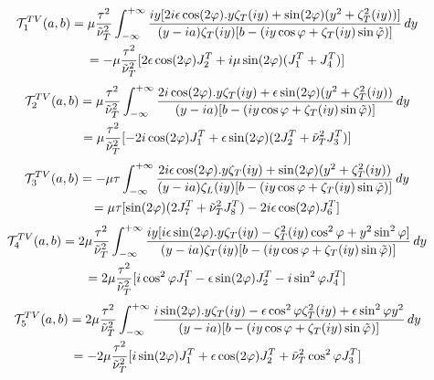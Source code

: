 \begin{multline}
\mathcal{T}_1^{TV}(a,b)= \mu\frac{\tau^2}{\nuti^2_T} \int_{-\infty}^{+\infty} \frac{iy\lbrack 2i\epsilon\cos(2\varphi).y\zeta_T(iy)+\sin(2\varphi)(y^2+\zeta_T^2(iy))\rbrack}{(y-ia)\zeta_T(iy)\lbrack b- (iy\cos \varphi+ \zeta_T(iy)\sin\phiti) \rbrack} \, dy \\
\hfill = -\mu\frac{\tau^2}{\nuti^2_T} \lbrack 2\epsilon\cos(2\varphi) J_2^T+i\mu\sin(2\varphi)(J_1^T+J_4^T)\rbrack \hfill
\end{multline}
\begin{multline}
\mathcal{T}_2^{TV}(a,b)=\mu\frac{\tau^2}{\nuti^2_T} \int_{-\infty}^{+\infty} \frac{2i \cos(2\varphi).y\zeta_T(iy)+\epsilon \sin(2\varphi)(y^2+\zeta_T^2(iy))}{(y-ia)\lbrack b- (iy\cos \varphi+\zeta_T(iy)\sin\phiti )\rbrack} \, dy \\
\hfill=\mu\frac{\tau^2}{\nuti^2_T} \lbrack -2i\cos(2\varphi)J_1^T+\epsilon\sin(2\varphi)(2J_2^T+\nuti_T^2 J_3^T) \rbrack \hfill
\end{multline}
\begin{multline}
\mathcal{T}_3^{TV}(a,b)=-\mu\tau \int_{-\infty}^{+\infty} \frac{ 2i\epsilon\cos(2\varphi).y\zeta_T(iy)+\sin(2\varphi)(y^2+\zeta_T^2(iy))}{(y-ia)\zeta_L(iy)\lbrack b- (iy\cos \varphi+ \zeta_T(iy)\sin \phiti) \rbrack} \, dy \\
\hfill = \mu\tau\lbrack \sin(2\varphi)(2J_7^T+\nuti_T^2J_8^T)-2i\epsilon\cos(2\varphi)J_6^T \rbrack \hfill
\end{multline}
\begin{multline}
\mathcal{T}_4^{TV}(a,b)=2 \mu\frac{\tau^2}{\nuti^2_T} \int_{-\infty}^{+\infty} \frac{iy\lbrack i\epsilon\sin(2\varphi).y\zeta_T(iy)-\zeta_T^2(iy)\cos^2\varphi+y^2\sin^2\varphi \rbrack}{(y-ia)\zeta_T(iy)\lbrack b- (iy\cos \varphi+\zeta_T(iy)\sin\phiti) \rbrack} \, dy \\
\hfill = 2\mu\frac{\tau^2}{\nuti^2_T} \lbrack i\cos^2\varphi J_1^T-\epsilon\sin(2\varphi)J_2^T-i\sin^2\varphi J_4^T \rbrack  \hfill
\end{multline}
\begin{multline}
\mathcal{T}_5^{TV}(a,b)=2\mu\frac{\tau^2}{\nuti^2_T} \int_{-\infty}^{+\infty} \frac{ i\sin(2\varphi).y\zeta_T(iy)-\epsilon \cos^2\varphi \zeta_T^2(iy)+\epsilon \sin^2\varphi y^2}{(y-ia)\lbrack b- (iy\cos \varphi+\zeta_T(iy)\sin\phiti) \rbrack} \, dy \\
\hfill=-2\mu\frac{\tau^2}{\nuti^2_T}\lbrack i\sin(2\varphi)J_1^T+\epsilon\cos(2\varphi)J_2^T+\nuti_T^2\cos^2\varphi J_3^T \rbrack \hfill
\end{multline}
